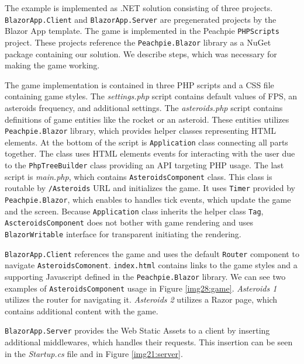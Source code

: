 \par
The example is implemented as .NET solution consisting of three projects. 
\texttt{BlazorApp.Client} and \texttt{BlazorApp.Server} are pregenerated projects by the Blazor App template.
The game is implemented in the Peachpie \texttt{PHPScripts} project.
These projects reference the \texttt{Peachpie.Blazor} library as a NuGet package containing our solution. 
We describe steps, which was necessary for making the game working.
\par
The game implementation is contained in three PHP scripts and a CSS file containing game styles.
The \textit{settings.php} script contains default values of FPS, an asteroids frequency, and additional settings.
The \textit{asteroids.php} script contains definitions of game entities like the rocket or an asteroid.
These entities utilizes \texttt{Peachpie.Blazor} library, which provides helper classes representing HTML elements.
At the bottom of the script is \texttt{Application} class connecting all parts together.
The class uses HTML elements events for interacting with the user due to the \texttt{PhpTreeBuilder} class providing an API targeting PHP usage.
The last script is \textit{main.php}, which contains \texttt{AsteroidsComponent} class.
This class is routable by \texttt{/Asteroids} URL and initializes the game.
It uses \texttt{Timer} provided by \texttt{Peachpie.Blazor}, which enables to handles tick events, which update the game and the screen.
Because \texttt{Application} class inherits the helper class \texttt{Tag}, \texttt{AscteroidsComponent} does not bother with game rendering and uses \texttt{BlazorWritable} interface for transparent initiating the rendering.
\par
\texttt{BlazorApp.Client} references the game and uses the default \texttt{Router} component to navigate \texttt{AsteroidsComonent}.
\texttt{index.html} contains links to the game styles and a supporting Javascript defined in the \texttt{Peachpie.Blazor} library.
We can see two examples of \texttt{AsteroidsComponent} usage in Figure \ref{img28:game}.
\textit{Asteroids 1} utilizes the router for navigating it.
\textit{Asteroids 2} utilizes a Razor page, which contains additional content with the game.
\par
\texttt{BlazorApp.Server} provides the Web Static Assets to a client by inserting additional middlewares, which handles their requests.
This insertion can be seen in the \textit{Startup.cs} file and in Figure \ref{img21:server}.
\par
